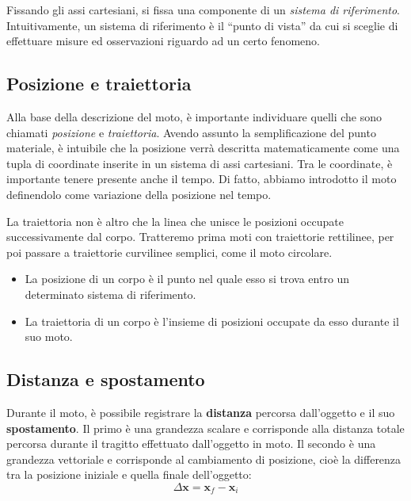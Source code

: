 Fissando gli assi cartesiani, si fissa una componente di un \textit{sistema di
riferimento}. Intuitivamente, un sistema di riferimento è il ``punto di vista''
da cui si sceglie di effettuare misure ed osservazioni riguardo ad un certo
fenomeno.

\subsection{Posizione e traiettoria}
Alla base della descrizione del moto, è importante individuare quelli che sono
chiamati \textit{posizione} e \textit{traiettoria}. Avendo assunto la semplificazione
del punto materiale, è intuibile che la posizione verrà descritta matematicamente
come una tupla di coordinate inserite in un sistema di assi cartesiani. Tra le
coordinate, è importante tenere presente anche il tempo. Di fatto, abbiamo
introdotto il moto definendolo come variazione della posizione nel tempo.

La traiettoria non è altro che la linea che unisce le posizioni occupate
successivamente dal corpo. Tratteremo prima moti con traiettorie rettilinee,
per poi passare a traiettorie curvilinee semplici, come il moto circolare.

\begin{tcolorbox}[colback = yellow!30, colframe = yellow!30!black, title = {Posizione e traiettoria}]
\begin{itemize}
    \item La posizione di un corpo è il punto nel quale esso si trova entro un
    determinato sistema di riferimento.

    \item La traiettoria di un corpo è l'insieme di posizioni occupate da esso
    durante il suo moto.
\end{itemize}
\end{tcolorbox}

\subsection{Distanza e spostamento}
Durante il moto, è possibile registrare la \textbf{distanza} percorsa
dall'oggetto e il suo \textbf{spostamento}. Il primo è una grandezza
scalare e corrisponde alla distanza totale percorsa durante il tragitto
effettuato dall'oggetto in moto. Il secondo è una grandezza vettoriale e
corrisponde al cambiamento di posizione,
cioè la differenza tra la posizione iniziale e quella finale dell'oggetto:
\[ \Delta \mathbf{x} = \mathbf{x}_f - \mathbf{x}_i \]


